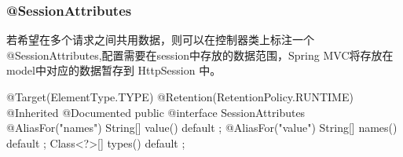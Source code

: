 \subsubsection{@SessionAttributes}

若希望在多个请求之间共用数据，则可以在控制器类上标注一个 @SessionAttributes,配置需要在session中存放的数据范围，Spring MVC将存放在model中对应的数据暂存到 HttpSession 中。

\begin{Java}
@Target({ElementType.TYPE})
@Retention(RetentionPolicy.RUNTIME)
@Inherited
@Documented
public @interface SessionAttributes {
    @AliasFor("names")
    String[] value() default {};
    @AliasFor("value")
    String[] names() default {};
    Class<?>[] types() default {};
}
\end{Java}

\newpage